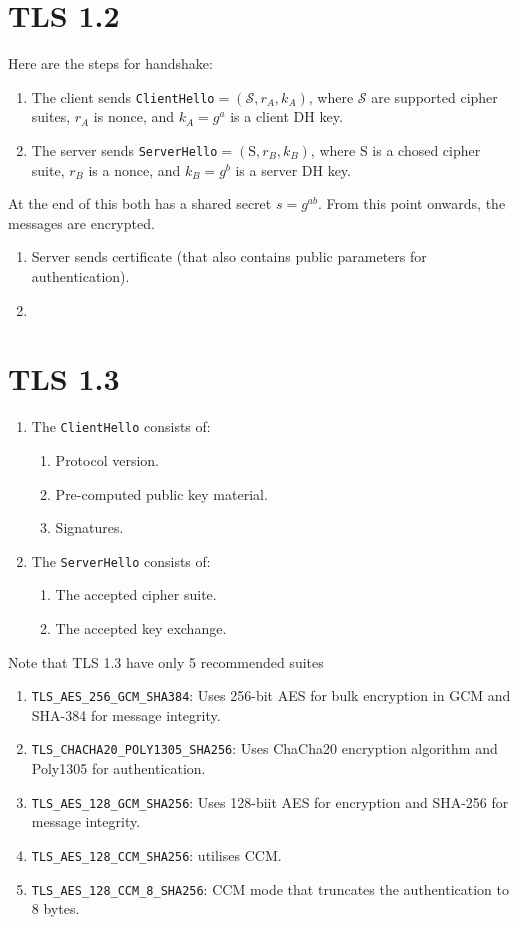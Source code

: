 \documentclass[a4paper, 12pt]{book} %
\begin{document}
\section{TLS 1.2}
Here are the steps for handshake: 
\begin{enumerate}
    \item The client sends \verb|ClientHello|$= (\mathscr{S}, r_A, k_A)$, where $\mathscr{S}$ are supported cipher suites, $r_A$ is nonce, and $k_A = g^a$ is a client DH key.
    \item The server sends \verb|ServerHello|$= (\mathrm{S}, r_B, k_B)$, where $\mathrm{S}$ is a chosed cipher suite, $r_B$ is a nonce, and $k_B = g^b$ is a server DH key.
\end{enumerate}
At the end of this both has a shared secret $s = g^{ab}$. From this point onwards, the messages are encrypted.
\begin{enumerate}
    \item Server sends certificate (that also contains public parameters for authentication).
    \item 
\end{enumerate}


\section{TLS 1.3}

\begin{enumerate}
    \item The \verb|ClientHello| consists of:
    \begin{enumerate}
        \item Protocol version.
        \item Pre-computed public key material.
        \item Signatures.
    \end{enumerate}
    \item The \verb|ServerHello| consists of:
    \begin{enumerate}
        \item The accepted cipher suite.
        \item The accepted key exchange.
    \end{enumerate}
\end{enumerate}

Note that TLS  1.3 have only 5 recommended suites
\begin{enumerate}
    \item \verb|TLS_AES_256_GCM_SHA384|: Uses 256-bit AES for bulk encryption in GCM and SHA-384 for message integrity.
    \item \verb|TLS_CHACHA20_POLY1305_SHA256|: Uses ChaCha20 encryption algorithm and Poly1305 for authentication.
    \item \verb|TLS_AES_128_GCM_SHA256|: Uses 128-biit AES for encryption and SHA-256 for message integrity.
    \item \verb|TLS_AES_128_CCM_SHA256|: utilises CCM.
    \item \verb|TLS_AES_128_CCM_8_SHA256|: CCM mode that truncates the authentication to 8 bytes.
\end{enumerate}
\end{document}
